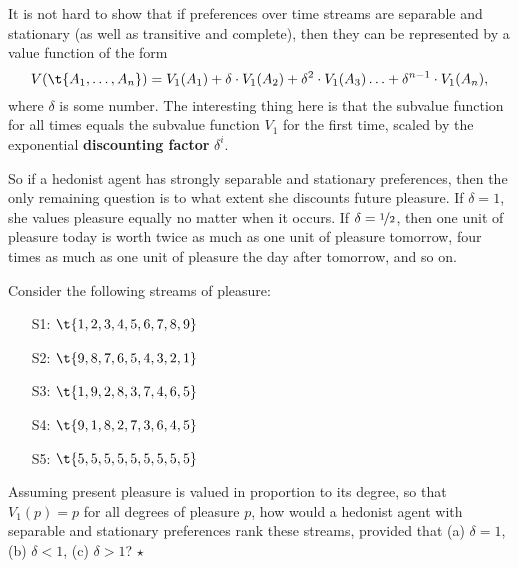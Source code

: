 It is not hard to show that if preferences over time streams are
separable and stationary (as well as transitive and complete), then
they can be represented by a value function of the form
\[
V(\t{A_1,\ldots,A_n}) = V_1(A_1) + \delta \cdot V_1(A_2) +
\delta^2 \cdot V_1(A_3) \ldots + \delta^{n-1} \cdot V_1(A_n),
\]
where $\delta$ is some number. The interesting thing here is that the
subvalue function for all times equals the subvalue function $V_1$ for
the first time, scaled by the exponential \textbf{discounting factor}
$\delta^i$.


So if a hedonist agent has strongly separable and stationary
preferences, then the only remaining question is to what extent she
discounts future pleasure. If $\delta = 1$, she values pleasure
equally no matter when it occurs. If $\delta = \nicefrac{1}{2}$, then
one unit of pleasure today is worth twice as much as one unit of
pleasure tomorrow, four times as much as one unit of pleasure the day
after tomorrow, and so on. 

\begin{exercise}
  Consider the following streams of pleasure:
  \begin{enumerate}
    \itemsep-0.3em 
  \item[S1:] $\t{1,2,3,4,5,6,7,8,9}$ 
  \item[S2:] $\t{9,8,7,6,5,4,3,2,1}$
  \item[S3:] $\t{1,9,2,8,3,7,4,6,5}$ 
  \item[S4:] $\t{9,1,8,2,7,3,6,4,5}$ 
  \item[S5:] $\t{5,5,5,5,5,5,5,5,5}$
  \end{enumerate}
  Assuming present pleasure is valued in proportion to its degree, so
  that $V_1(p) = p$ for all degrees of pleasure $p$, how would a
  hedonist agent with separable and stationary preferences rank these
  streams, provided that (a) $\delta = 1$, (b)
  $\delta < 1$, (c) $\delta > 1$? $\star$
\end{exercise}

